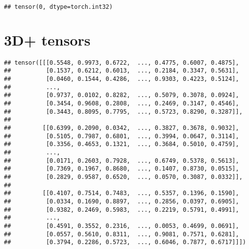 \documentclass[]{book}
\newenvironment{Shaded}{\begin{snugshade}}{\end{snugshade}}
\newcommand{\CommentTok}[1]{\textcolor[rgb]{0.56,0.35,0.01}{\textit{#1}}}
\newcommand{\KeywordTok}[1]{\textcolor[rgb]{0.13,0.29,0.53}{\textbf{#1}}}
\newcommand{\NormalTok}[1]{#1}
\newcommand{\OperatorTok}[1]{\textcolor[rgb]{0.81,0.36,0.00}{\textbf{#1}}}
\newcommand{\StringTok}[1]{\textcolor[rgb]{0.31,0.60,0.02}{#1}}
\begin{document}
\begin{verbatim}
## tensor(0, dtype=torch.int32)
\end{verbatim}

\hypertarget{d-tensors}{%
\section{3D+ tensors}\label{d-tensors}}

\begin{Shaded}
\end{Shaded}

\begin{verbatim}
## tensor([[[0.5548, 0.9973, 0.6722,  ..., 0.4775, 0.6007, 0.4875],
##          [0.1537, 0.6212, 0.6013,  ..., 0.2184, 0.3347, 0.5631],
##          [0.0460, 0.1544, 0.4286,  ..., 0.9303, 0.4223, 0.5124],
##          ...,
##          [0.9737, 0.0102, 0.8282,  ..., 0.5079, 0.3078, 0.0924],
##          [0.3454, 0.9608, 0.2808,  ..., 0.2469, 0.3147, 0.4546],
##          [0.3443, 0.8095, 0.7795,  ..., 0.5723, 0.8290, 0.3287]],
## 
##         [[0.6399, 0.2090, 0.0342,  ..., 0.3827, 0.3678, 0.9032],
##          [0.5105, 0.7987, 0.6801,  ..., 0.3994, 0.0647, 0.3114],
##          [0.3356, 0.4653, 0.1321,  ..., 0.3684, 0.5010, 0.4759],
##          ...,
##          [0.0171, 0.2603, 0.7928,  ..., 0.6749, 0.5378, 0.5613],
##          [0.7369, 0.1967, 0.8680,  ..., 0.1407, 0.8730, 0.0515],
##          [0.2829, 0.9587, 0.6520,  ..., 0.0570, 0.3087, 0.0332]],
## 
##         [[0.4107, 0.7514, 0.7483,  ..., 0.5357, 0.1396, 0.1590],
##          [0.0334, 0.1690, 0.8897,  ..., 0.2856, 0.0397, 0.6905],
##          [0.9382, 0.2469, 0.5983,  ..., 0.2219, 0.5791, 0.4991],
##          ...,
##          [0.4591, 0.3552, 0.2316,  ..., 0.0053, 0.4699, 0.0691],
##          [0.0557, 0.5610, 0.8311,  ..., 0.9081, 0.7571, 0.6281],
##          [0.3794, 0.2286, 0.5723,  ..., 0.6046, 0.7877, 0.6717]]])
\end{verbatim}

\begin{Shaded}
\end{Shaded}
\end{document}
